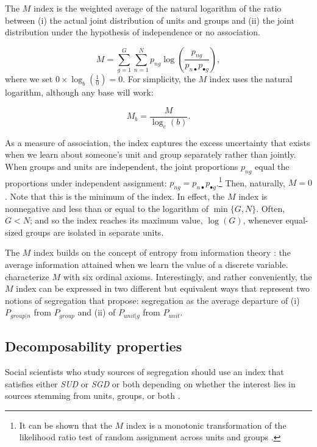 The $M$ index is the weighted average of the natural logarithm of the ratio between (i) the actual joint distribution of units and groups and (ii) the joint distribution under the hypothesis of independence or no association.

\begin{equation}
    M = \sum_{g=1}^{G} \sum_{n=1}^{N} p_{ng} \log{ \left( \frac{p_{ng}}{p_{n \bullet} p_{\bullet g}} \right),}
    \label{eq: M-definition}
\end{equation}
where we set $0 \times \log_{b} \left( \frac{1}{0} \right) = 0$. For simplicity, the $M$ index uses the natural logarithm, although any base will work:

\begin{equation}
    M_b = \frac{M}{\log_e{\left(b\right)}}.
    \label{eq: M-base-change}
\end{equation}

As a measure of association, the index captures the excess uncertainty that exists when we learn about someone's unit and group separately rather than jointly. When groups and units are independent, the joint proportions $p_{ng}$ equal the proportions under independent assignment: $p_{ng} = p_{n \bullet} p_{\bullet g}$.\footnote{It can be shown that the $M$ index is a monotonic transformation of the likelihood ratio test of random assignment across units and groups \citep{zoloth_1974}.} Then, naturally, $M=0$. Note that this is the minimum of the index. In effect, the $M$ index is nonnegative and less than or equal to the logarithm of $\min \{G,N\}$. Often, $G < N$; and so the index reaches its maximum value, $\log(G)$, whenever equal-sized groups are isolated in separate units.

The $M$ index builds on the concept of entropy from information theory \citep{kullback_1959}: the average information attained when we learn the value of a discrete variable.
\citet{frankel_volij_2011} characterize $M$ with six ordinal axioms.
Interestingly, and rather conveniently, the $M$ index can be expressed in two different but equivalent ways that represent two notions of segregation that \citet{massey_denton_1988} propose: segregation as the average departure of (i) $P_{group | n}$ from $P_{group}$ and (ii) of $P_{unit | g}$ from $P_{unit}$.

\subsection{Decomposability properties}
Social scientists who study sources of segregation should use an index that satisfies either \textit{SUD} or \textit{SGD} or both depending on whether the interest lies in sources stemming from units, groups, or both \citep{mora_ruiz-castillo_2003, frankel_volij_2011, mora2011entropy}.

